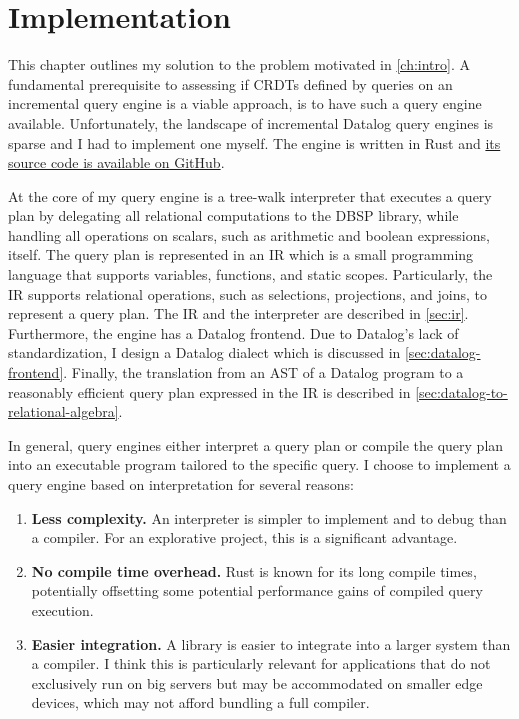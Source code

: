 
\chapter{Implementation}\label{ch:implementation}

This chapter outlines my solution to the problem motivated in \ref{ch:intro}.
A fundamental prerequisite to assessing if \acp{CRDT} defined by queries on an
incremental query engine is a viable approach, is to have such a query
engine available.
Unfortunately, the landscape of incremental Datalog query engines is sparse
and I had to implement one myself.
The engine is written in Rust and \href{https://github.com/lstwn/masterthesis}{%
its source code is available on GitHub}\footnotemark{}.


At the core of my query engine is a tree-walk interpreter that executes a
query plan by delegating all relational computations to the DBSP library,
while handling all operations on scalars, such as arithmetic and boolean
expressions, itself.
The query plan is represented in an \acf{IR} which is a small programming
language that supports variables, functions, and static scopes.
Particularly, the \ac{IR} supports relational operations,
such as selections, projections, and joins, to represent a query plan.
The \ac{IR} and the interpreter are described in \ref{sec:ir}.
Furthermore, the engine has a Datalog frontend.
Due to Datalog's lack of standardization, I design a Datalog dialect which is
discussed in \ref{sec:datalog-frontend}.
Finally, the translation from an \ac{AST} of a Datalog program to a reasonably
efficient query plan expressed in the \ac{IR} is described
in \ref{sec:datalog-to-relational-algebra}.

In general, query engines either interpret a query plan or compile the query
plan into an executable program tailored to the specific query.
I choose to implement a query engine based on interpretation for several
reasons:

\begin{enumerate}
	\item \textbf{Less complexity.}
	      An interpreter is simpler to implement and to debug than a compiler.
	      For an explorative project, this is a significant advantage.
	\item \textbf{No compile time overhead.}
	      Rust is known for its long compile times, potentially offsetting some
	      potential performance gains of compiled query execution.
	\item \textbf{Easier integration.}
	      A library is easier to integrate into a larger system than a compiler.
	      I think this is particularly relevant for applications that do not
	      exclusively run on big servers but may be accommodated on smaller
	      edge devices, which may not afford bundling a full compiler.
\end{enumerate}

